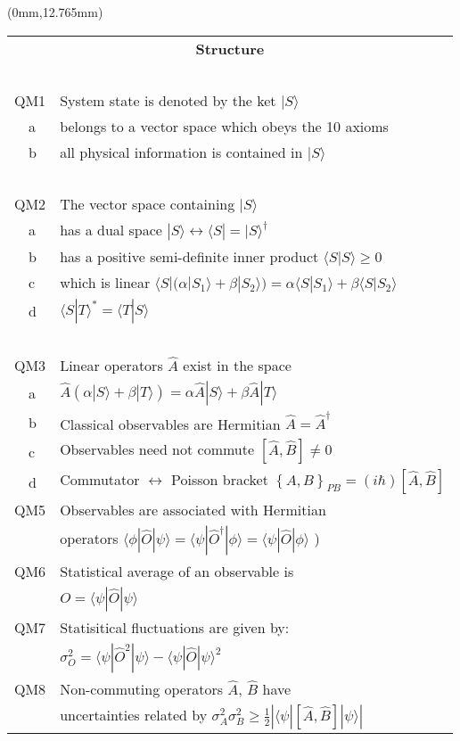 \begin{textblock*}{82mm}(0mm,12.765mm)
\begin{tabular*}{82mm}{l @{\extracolsep{\fill}} l}
\multicolumn{2}{c}{\bf Structure} \\
~ & ~\\
QM1  & System state is denoted by the ket $| S \rangle$ \\
  ~~a& belongs to a vector space which obeys the 10 axioms\\
  ~~b& all physical information is contained in $| S \rangle$ \\  
~ & ~\\
QM2  & The vector space containing $| S \rangle$ \\
  ~~a& has a dual space $| S \rangle \longleftrightarrow  \langle S | = |S\rangle^{\dagger}$ \\
  ~~b& has a positive semi-definite inner product $\langle S | S \rangle \geq 0$ \\
  ~~c& which is linear $ \langle S | \big( \alpha | S_1 \rangle + \beta | S_2 \rangle \big) 
       = \alpha \langle S | S_1 \rangle + \beta \langle S | S_2 \rangle$ \\
  ~~d& $\langle S | T \rangle ^* = \langle T | S \rangle$ \\
~ & ~\\
QM3  & Linear operators $\hat A$ exist in the space\\
  ~~a& $\hat A \left( \alpha |S\rangle + \beta |T\rangle \right) 
        = \alpha \hat A |S\rangle + \beta \hat A |T\rangle$\\
  ~~b& Classical observables are Hermitian $\hat A = \hat A^{\dagger}$\\
  ~~c& Observables need not commute $\left[ \hat A, \hat B\right] \neq 0$\\
  ~~d& Commutator $\leftrightarrow$ Poisson bracket 
       $\left\{ A, B \right\}_{PB} = \left( i \hbar \right) \left[ \hat A, \hat B \right]$\\
QM5  & Observables are associated with Hermitian \\
     & operators $\langle \phi | \hat O | \psi \rangle
        = \langle \psi | \hat O ^ \dagger | \phi \rangle 
        = \langle \psi | \hat O | \phi \rangle$ )\\
QM6  & Statistical average of an observable is \\
     &$O = \langle \psi | \hat O | \psi \rangle$\\
QM7  & Statisitical fluctuations are given by:\\
     &$\sigma_{O}^2 = \langle \psi | \hat O ^2 | \psi \rangle 
     - \langle \psi | \hat O | \psi \rangle ^2$ \\
QM8  &Non-commuting operators $\hat A$, $\hat B$ have\\
     &uncertainties related by $ \sigma_A^2 \sigma_B^2 
     \ge \frac{1}{2} \left| \langle \psi | [ \hat A , \hat B ] | \psi \rangle \right|$\\
\end{tabular*}
\end{textblock*}

